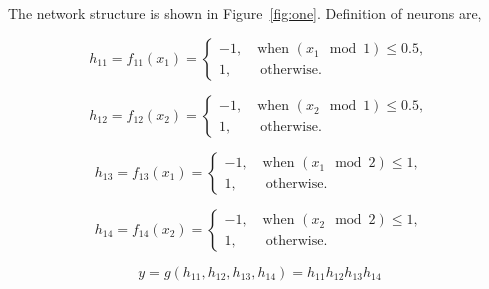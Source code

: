 \subsection{} %

The network structure is shown in Figure~\ref{fig:one}.
Definition of neurons are,

\begin{equation}
    h_{11} = f_{11}(x_1) = \begin{cases}
            -1, \quad \text{when } (x_1\mod 1) \le 0.5, \\
            1, \quad\quad \text{otherwise}.
        \end{cases}
\end{equation}

\begin{equation}
    h_{12} = f_{12}(x_2) = \begin{cases}
            -1, \quad \text{when } (x_2\mod 1) \le 0.5, \\
            1, \quad\quad \text{otherwise}.
        \end{cases}
\end{equation}

\begin{equation}
    h_{13} = f_{13}(x_1) = \begin{cases}
            -1, \quad \text{when } (x_1\mod 2) \le 1, \\
            1, \quad\quad \text{otherwise}.
        \end{cases}
\end{equation}

\begin{equation}
    h_{14} = f_{14}(x_2) = \begin{cases}
            -1, \quad \text{when } (x_2\mod 2) \le 1, \\
            1, \quad\quad \text{otherwise}.
        \end{cases}
\end{equation}

\begin{equation}
    y = g(h_{11}, h_{12}, h_{13}, h_{14}) =
        h_{11} h_{12} h_{13} h_{14}
\end{equation}
